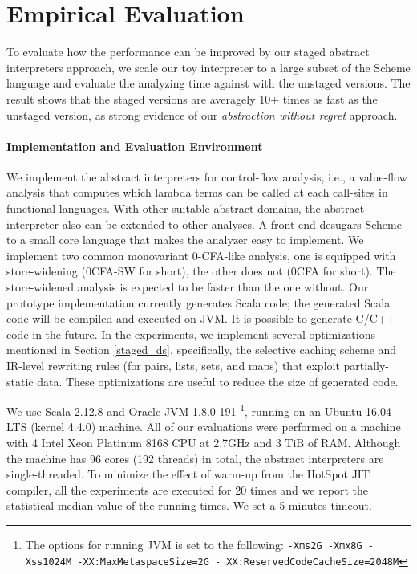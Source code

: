 \section{Empirical Evaluation} \label{evaluation}

To evaluate how the performance can be improved by our staged abstract interpreters
approach, we scale our toy interpreter to a large subset of the Scheme language
and evaluate the analyzing time against with the unstaged versions. The result
shows that the staged versions are averagely 10+ times as fast as the unstaged
version, as strong evidence of our \textit{abstraction without regret}
approach.

\paragraph{Implementation and Evaluation Environment} We implement the abstract
interpreters for control-flow analysis, i.e., a value-flow analysis that
computes which lambda terms can be called at each call-sites in functional
languages. With other suitable abstract domains, the abstract interpreter also
can be extended to other analyses. A front-end desugars Scheme to a small core
language that makes the analyzer easy to implement. We implement two common
monovariant 0-CFA-like analysis, one is equipped with store-widening (0CFA-SW
for short), the other does not (0CFA for short). The store-widened analysis is
expected to be faster than the one without.  Our prototype implementation
currently generates Scala code; the generated Scala code will be compiled and
executed on JVM. It is possible to generate C/C++ code in the future. In the
experiments, we implement several optimizations mentioned in Section
\ref{staged_ds}, specifically, the selective caching scheme and IR-level
rewriting rules (for pairs, lists, sets, and maps) that exploit
partially-static data. These optimizations are useful to reduce the size of
generated code.

We use Scala 2.12.8 and Oracle JVM 1.8.0-191 \footnote{The options for
running JVM is set to the following: \texttt{-Xms2G -Xmx8G -Xss1024M
-XX:MaxMetaspaceSize=2G - XX:ReservedCodeCacheSize=2048M}},
running on an Ubuntu 16.04 LTS (kernel 4.4.0) machine. All of our
evaluations were performed on a machine with 4 Intel Xeon Platinum
8168 CPU at 2.7GHz and 3 TiB of RAM. Although the machine has 96 cores
(192 threads) in total, the abstract interpreters are single-threaded.
To minimize the effect of warm-up from the HotSpot JIT compiler,
all the experiments are executed for 20 times and we report the
statistical median value of the running times. We set a 5 minutes
timeout.

